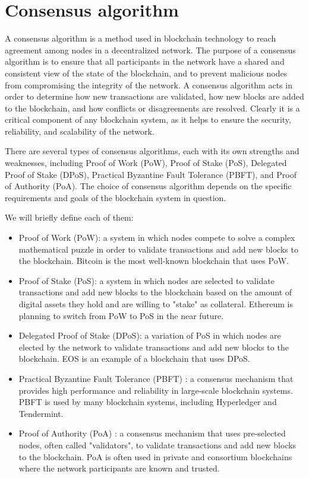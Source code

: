 \documentclass[target=mst,aauheader=]{thud}
\begin{document}
    \section{Consensus algorithm}
    
    A consensus algorithm is a method used in blockchain technology to reach agreement among nodes in a decentralized network. The purpose of a consensus algorithm is to ensure that all participants in the network have a shared and consistent view of the state of the blockchain, and to prevent malicious nodes from compromising the integrity of the network.
    A consensus algorithm acts in order to determine how new transactions are validated, how new blocks are added to the blockchain, and how conflicts or disagreements are resolved. Clearly it is a critical component of any blockchain system, as it helps to ensure the security, reliability, and scalability of the network.
    
    There are several types of consensus algorithms, each with its own strengths and weaknesses, including Proof of Work (PoW), Proof of Stake (PoS), Delegated Proof of Stake (DPoS), Practical Byzantine Fault Tolerance (PBFT), and Proof of Authority (PoA). The choice of consensus algorithm depends on the specific requirements and goals of the blockchain system in question. 

    We will briefly define each of them:
    
    \begin{itemize}    

        \item Proof of Work (PoW): a system in which nodes compete to solve a complex mathematical puzzle in order to validate transactions and add new blocks to the blockchain. Bitcoin \cite{nakamoto2008bitcoin} is the most well-known blockchain that uses PoW.
        \item Proof of Stake (PoS): a system in which nodes are selected to validate transactions and add new blocks to the blockchain based on the amount of digital assets they hold and are willing to "stake" as collateral. Ethereum \cite{buterin2014next} is planning to switch from PoW to PoS in the near future.
        \item Delegated Proof of Stake (DPoS): a variation of PoS in which nodes are elected by the network to validate transactions and add new blocks to the blockchain. EOS \cite{xu2018eos} is an example of a blockchain that uses DPoS.
        \item Practical Byzantine Fault Tolerance (PBFT) \cite{byzantineConsensus}: a consensus mechanism that provides high performance and reliability in large-scale blockchain systems. PBFT is used by many blockchain systems, including Hyperledger and Tendermint.
        \item Proof of Authority (PoA) \cite{poaFeasibility}: a consensus mechanism that uses pre-selected nodes, often called "validators", to validate transactions and add new blocks to the blockchain. PoA is often used in private and consortium blockchains where the network participants are known and trusted.

    \end{itemize}
\end{document}
